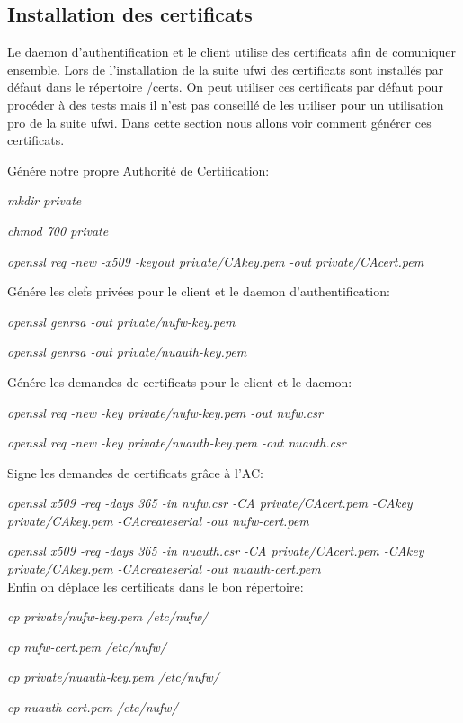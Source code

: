 \documentclass[12pt]{report}
\begin{document}
\begin{itemize}
\section{Installation des certificats}

Le daemon d'authentification et le client utilise des certificats afin de comuniquer ensemble. Lors de l'installation de la
suite ufwi des certificats sont installés par défaut dans le répertoire /certs. On peut utiliser ces certificats par défaut 
pour procéder à des tests mais il n'est pas conseillé de les utiliser pour un utilisation pro de la suite ufwi. Dans cette 
section nous allons voir comment générer ces certificats.

Génére notre propre Authorité de Certification:

\textit{mkdir private}

\textit{chmod 700 private}

\textit{openssl req -new -x509 -keyout private/CAkey.pem -out private/CAcert.pem}

Génére les clefs privées pour le client et le daemon d'authentification:

\textit{openssl genrsa -out private/nufw-key.pem}

\textit{openssl genrsa -out private/nuauth-key.pem}

Génére les demandes de certificats pour le client et le daemon:

\textit{openssl req -new -key private/nufw-key.pem -out nufw.csr}

\textit{openssl req -new -key private/nuauth-key.pem -out nuauth.csr}

Signe les demandes de certificats grâce à l’AC:

\textit{openssl x509 -req -days 365 -in nufw.csr -CA private/CAcert.pem -CAkey private/CAkey.pem -CAcreateserial -out nufw-cert.pem}

\textit{openssl x509 -req -days 365 -in nuauth.csr -CA private/CAcert.pem -CAkey private/CAkey.pem -CAcreateserial -out nuauth-cert.pem}
\\
Enfin on déplace les certificats dans le bon répertoire:

\textit{cp private/nufw-key.pem /etc/nufw/}

\textit{cp nufw-cert.pem /etc/nufw/}

\textit{cp private/nuauth-key.pem /etc/nufw/}

\textit{cp nuauth-cert.pem /etc/nufw/}













\end{itemize}
\end{document}
